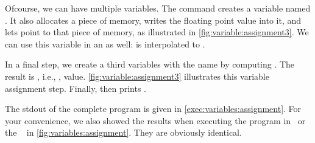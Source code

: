 Ofcourse, we can have multiple variables.
The command  creates a variable named .
It also allocates a piece of memory, writes the floating point value  into it, and lets  point to that piece of memory, as illustrated in \cref{fig:variable:assignment3}.
We can use this variable in an  as well:
 is interpolated to .%
%
\begin{sloppypar}%
In a final step, we create a third variables with the name  by computing .
The result is , i.e., ,  value.
\cref{fig:variable:assignment3} illustrates this variable assignment step.
Finally,  then prints .%
\end{sloppypar}%
%
The \acrfull{stdout} of the complete program is given in \cref{exec:variables:assignment}.
For your convenience, we also showed the results when executing the program in \pycharm\ or the \ubuntu\  in \cref{fig:variables:assignment}.
They are obviously identical.

